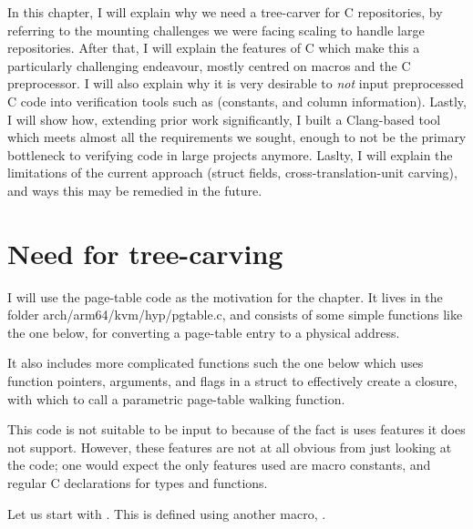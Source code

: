 \margintoc{}

In this chapter, I will explain why we need a tree-carver for C repositories,
by referring to the mounting challenges we were facing scaling  to
handle large repositories. After that, I will explain the features of C which
make this a particularly challenging endeavour, mostly centred on macros and
the C preprocessor. I will also explain why it is very desirable to \emph{not}
input preprocessed C code into verification tools such as  (constants,
and column information). Lastly, I will show how, extending prior work
significantly, I built a Clang-based tool which meets almost all the
requirements we sought, enough to not be the primary bottleneck to verifying
code in large projects anymore. Laslty, I will explain the limitations of the
current approach (struct fields, cross-translation-unit carving), and ways this
may be remedied in the future.

\section{Need for tree-carving}

I will use the  page-table code as the motivation for the chapter.
It lives in the folder arch/arm64/kvm/hyp/pgtable.c, and consists of some simple
functions like the one below, for converting a page-table entry to a physical
address.



It also includes more complicated functions such the one below which uses function
pointers, arguments, and flags in a struct to effectively create a closure, with
which to call a parametric page-table walking function.


This code is not suitable to be input to  because of the fact
is uses features it does not support. However, these features are not at
all obvious from just looking at the code; one would expect the only features
used are macro constants, and regular C declarations for types and functions.

Let us start with . This is defined using another
macro, .



